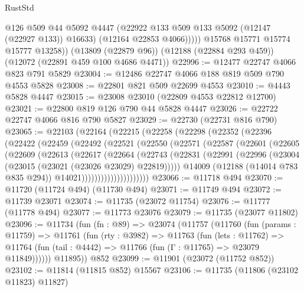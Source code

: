 \begin{lexlean}{RustStd}
\begin{coremodule}
                @126
                @509
                @44
                @5092
                @4447
                (@22922 @133 @509 @133 @5092 (@12147 (@22927 @133)) @16633)
                (@12164 @22853 @4066)))))
        @15768
        @15771
        @15774
        @15777
        @13258))
    (@13809 (@22879 @96))
    (@12188 (@22884 @293 @459))
    (@12072 (@22891 @459 @100 @4686 @4471))
@22996 := @12477 @22747 @4066 @823 @791 @5829
@23004 := @12486 @22747 @4066 @188 @819 @509 @790 @4553 @5828
@23008 := @22801 @821 @509 @22699 @4553
@23010 := @4443 @5828 @4447
@23015 := @23008 @23010 (@22809 @4553 @22812 @12700)
@23021 := @22800 @819 @126 @790 @44 @5828 @4447
@23026 := @22722 @22747 @4066 @816 @790 @5827
@23029 := @22730 (@22731 @816 @790)
@23065 := @22103
    (@22164
      (@22215
        (@22258
          (@22298
            (@22352
              (@22396
                (@22422
                  (@22459
                    (@22492
                      (@22521
                        (@22550
                          (@22571
                            (@22587
                              (@22601
                                (@22605
                                  (@22609
                                    (@22613
                                      (@22617
                                        (@22664
                                          (@22743
                                            (@22831
                                              (@22991
                                                (@22996
                                                  (@23004
                                                    (@23015 (@23021 (@23026 @23029) @22819)))))
                                              @14009
                                              (@12188 (@14014 @783 @835 @294))
                                              @14021)))))))))))))))))))))
@23066 := @11718 @494
@23070 := @11720 (@11724 @494) (@11730 @494)
@23071 := @11749 @494
@23072 := @11739 @23071
@23074 := @11735 (@23072 @11754)
@23076 := @11777 (@11778 @494)
@23077 := @11773 @23076
@23079 := @11735 (@23077 @11802)
@23096 := @11734
    (fun (fn : @89) =>
    @23074
      (@11757
        (@11760
          (fun (params : @11759) =>
          @11761
            (fun (rty : @3982) =>
            @11763
              (fun (lets : @11762) =>
              @11764 (fun (tail : @4442) => @11766 (fun (Γ : @11765) => @23079 @11849))))))
        @11895))
    @852
@23099 := @11901 (@23072 (@11752 @852))
@23102 := @11814 (@11815 @852) @15567
@23106 := @11735 (@11806 (@23102 @11823) @11827)

\end{coremodule}
\end{lexlean}
